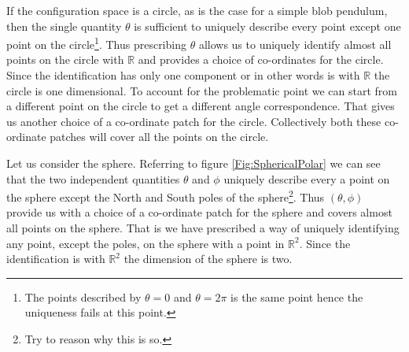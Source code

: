 \documentclass[graybox,envcountchap,sectrefs]{svmonoMuga}
\begin{document}
\begin{example}
If the configuration space is a circle, as is the case for a simple blob pendulum, then the single quantity $\theta$ is sufficient to uniquely describe every point except one point on the 
circle\footnote{The points described by $\theta=0$ and $\theta=2\pi$ is the same point hence the uniqueness fails at this point.}. Thus prescribing $\theta$ allows us to uniquely 
identify almost all points on the circle with $\mathbb{R}$ and provides a choice of co-ordinates for the circle. Since the identification has only one component or in other words is with 
$\mathbb{R}$ the circle is one dimensional. To account for the problematic point we can start from a different point on the circle to get a different angle correspondence. That gives us 
another choice of a co-ordinate patch for the circle. Collectively both these co-ordinate patches will cover all the points on the circle.
\end{example}


\begin{example}
Let us consider the sphere. Referring to figure \ref{Fig:SphericalPolar}
we can see that the two independent quantities $\theta$ and $\phi$ uniquely describe every a point on the sphere except the North and South poles of the sphere\footnote{Try to 
reason why this is so.}. Thus $(\theta,\phi)$ provide us with a choice of a co-ordinate patch for the sphere and covers almost all points on the sphere. That is we have prescribed a way of 
uniquely identifying any point, except the poles, on the sphere with a point in $\mathbb{R}^2$. Since the identification is with $\mathbb{R}^2$ the dimension of the sphere is two. 
\end{example}




\end{document}

